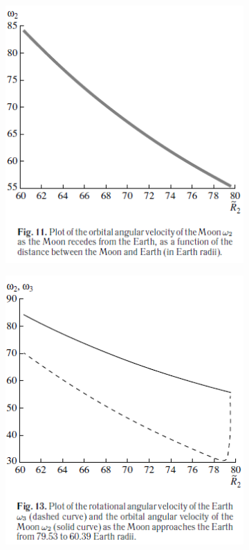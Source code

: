 \documentclass[fontsize = 11pt,a4paper]{article}
\begin{document}
\begin{figure}[h!]
  \begin{subfigure}[t]{0.4\linewidth}
    \includegraphics[width=\linewidth]{graph11.png}
  \end{subfigure}
  \begin{subfigure}[t]{0.4\linewidth}
    \includegraphics[width=\linewidth]{graph13.png}

\end{subfigure}
\end{figure}
\end{document}
